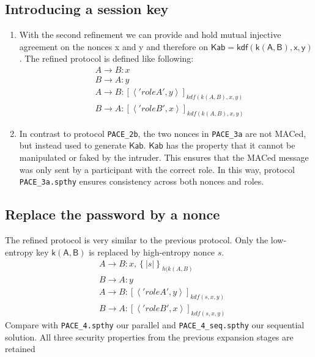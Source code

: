 \documentclass[a4paper,11pt]{scrartcl}
\newcommand{\tuple}[1]{\left\langle #1\right\rangle}
\begin{document}
\subsection{Introducing a session key}
\begin{enumerate}[label=\alph*)]
	\item With the second refinement we can provide and hold mutual injective agreement on the nonces x and y and therefore on $\mathsf{Kab = kdf(k(A,B),x,y)}$. The refined protocol is defined like following:
	\begin{align*}
	&A \rightarrow B: x\\
	&B \rightarrow A: y\\
	&A \rightarrow B: [\tuple{'roleA',  y}]_{kdf(k(A,  B), x, y)}\\
	&B \rightarrow A: [\tuple{'roleB',  x}]_{kdf(k(A,  B), x, y)}
	\end{align*}
	\item In contrast to protocol \texttt{PACE\_2b}, the two nonces in \texttt{PACE\_3a} are not MACed, but instead used to generate $\mathsf{Kab}$.  $\mathsf{Kab}$ has the property that it cannot be manipulated or faked by the intruder. This ensures that the MACed message was only sent by a participant with the correct role. In this way,  protocol 	\texttt{PACE\_3a.spthy} ensures consistency across both nonces and roles.
\end{enumerate}
\subsection{Replace the password by a nonce}
The refined protocol is very similar to the previous protocol. Only the low-entropy key $\mathsf{k(A,B)}$ is replaced by high-entropy nonce $s$.
	\begin{align*}
	&A \rightarrow B: x, \left\lbrace| s | \right\rbrace_{h(k(A,B)}\\
	&B \rightarrow A: y\\
	&A \rightarrow B: [\tuple{'roleA',  y}]_{kdf(s, x, y)}\\
	&B \rightarrow A: [\tuple{'roleB',  x}]_{kdf(s, x, y)}
	\end{align*}
	Compare with \texttt{PACE\_4.spthy} our parallel and \texttt{PACE\_4\_seq.spthy} our sequential solution.  All three security properties from the previous expansion stages are retained
\end{document}
